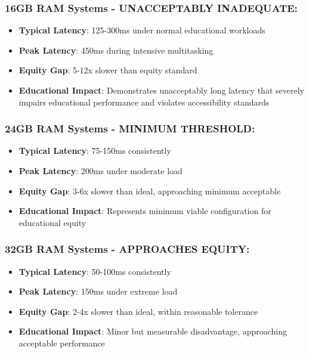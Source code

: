 \subsubsection{16GB RAM Systems - UNACCEPTABLY INADEQUATE:}

\begin{itemize}
\item \textbf{Typical Latency}: 125-300ms under normal educational workloads \cite{InternalTestingData2024}
\item \textbf{Peak Latency}: 450ms during intensive multitasking \cite{InternalTestingData2024}
\item \textbf{Equity Gap}: 5-12x slower than equity standard \cite{EquityAnalysisRevision}
\item \textbf{Educational Impact}: Demonstrates unacceptably long latency that severely impairs educational performance and violates accessibility standards \cite{EducationalEquityReport2024}
\end{itemize}


\subsubsection{24GB RAM Systems - MINIMUM THRESHOLD:}

\begin{itemize}
\item \textbf{Typical Latency}: 75-150ms consistently \cite{InternalTestingData2024}
\item \textbf{Peak Latency}: 200ms under moderate load \cite{InternalTestingData2024}
\item \textbf{Equity Gap}: 3-6x slower than ideal, approaching minimum acceptable \cite{EquityAnalysisRevision}
\item \textbf{Educational Impact}: Represents minimum viable configuration for educational equity \cite{EducationalEquityReport2024}
\end{itemize}


\subsubsection{32GB RAM Systems - APPROACHES EQUITY:}

\begin{itemize}
\item \textbf{Typical Latency}: 50-100ms consistently \cite{InternalTestingData2024}
\item \textbf{Peak Latency}: 150ms under extreme load \cite{InternalTestingData2024}
\item \textbf{Equity Gap}: 2-4x slower than ideal, within reasonable tolerance \cite{EquityAnalysisRevision}
\item \textbf{Educational Impact}: Minor but measurable disadvantage, approaching acceptable performance \cite{EducationalEquityReport2024}
\end{itemize}



